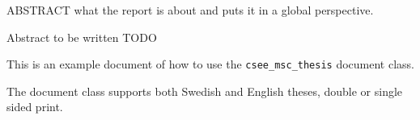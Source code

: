 ABSTRACT \- what the report is about and puts it in a global perspective.

Abstract to be written TODO

This is an example document of how to use the
\texttt{csee\_msc\_thesis} document class.

The document class supports both Swedish and English theses, double
or single sided print.
